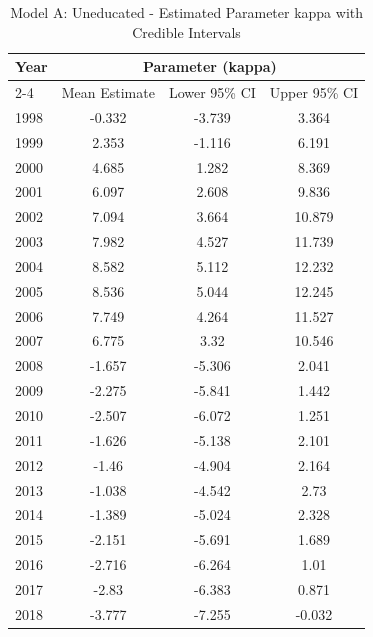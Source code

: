 \begin{landscape}
\begin{table}[htbp]
\centering
\caption{Model A: Uneducated - Estimated Parameter kappa with Credible Intervals}
\label{tab:Fparameters_k1}
\begin{tabular}{@{}lccc@{}}
\toprule
Year & \multicolumn{3}{c}{Parameter (kappa)} \\
\cmidrule(lr){2-4}
      & Mean Estimate & Lower 95\% CI & Upper 95\% CI \\
\midrule
1998 & -0.332 & -3.739 & 3.364 \\
1999 & 2.353 & -1.116 & 6.191 \\
2000 & 4.685 & 1.282 & 8.369 \\
2001 & 6.097 & 2.608 & 9.836 \\
2002 & 7.094 & 3.664 & 10.879 \\
2003 & 7.982 & 4.527 & 11.739 \\
2004 & 8.582 & 5.112 & 12.232 \\
2005 & 8.536 & 5.044 & 12.245 \\
2006 & 7.749 & 4.264 & 11.527 \\
2007 & 6.775 & 3.32 & 10.546 \\
2008 & -1.657 & -5.306 & 2.041 \\
2009 & -2.275 & -5.841 & 1.442 \\
2010 & -2.507 & -6.072 & 1.251 \\
2011 & -1.626 & -5.138 & 2.101 \\
2012 & -1.46 & -4.904 & 2.164 \\
2013 & -1.038 & -4.542 & 2.73 \\
2014 & -1.389 & -5.024 & 2.328 \\
2015 & -2.151 & -5.691 & 1.689 \\
2016 & -2.716 & -6.264 & 1.01 \\
2017 & -2.83 & -6.383 & 0.871 \\
2018 & -3.777 & -7.255 & -0.032 \\
\bottomrule
\end{tabular}
\end{table}
\end{landscape}